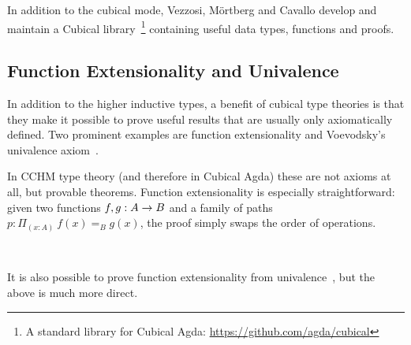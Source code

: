 In addition to the cubical mode, Vezzosi, M\"ortberg and Cavallo develop and
maintain a Cubical library~\footnote[1]{A standard library for Cubical
  Agda: \url{https://github.com/agda/cubical}} containing useful data types,
functions and proofs.

\subsection{Function Extensionality and Univalence}

In addition to the higher inductive types, a benefit of cubical type theories
is that they make it possible to prove
useful results that are usually only axiomatically defined. Two
prominent examples are function extensionality and Voevodsky's univalence
axiom~\cite{voevodsky2014}.

In CCHM type theory (and therefore in Cubical Agda) these are not axioms
at all, but provable theorems. Function extensionality is especially
straightforward: given two functions $f,g : A \rightarrow B$ and a
family of paths $p : \Pi_{(x:A)}~f(x) =_B g(x)$, the proof simply swaps the
order of operations.
\begin{code}%
\>[0]\AgdaSpace{}%
\AgdaSymbol{:}\AgdaSpace{}%
\AgdaSymbol{\{}\AgdaSpace{}%
\AgdaSpace{}%
\AgdaSymbol{:}\AgdaSpace{}%
\AgdaSymbol{\}}\AgdaSpace{}%
\AgdaSymbol{\{}\AgdaSpace{}%
\AgdaSpace{}%
\AgdaSymbol{:}\AgdaSpace{}%
\AgdaSpace{}%
\AgdaSpace{}%
\AgdaSymbol{\}}\AgdaSpace{}%
\AgdaSpace{}%
\AgdaSymbol{((}\AgdaSpace{}%
\AgdaSymbol{:}\AgdaSpace{}%
\AgdaSymbol{)}\AgdaSpace{}%
\AgdaSpace{}%
\AgdaSpace{}%
\AgdaSpace{}%
\AgdaSpace{}%
\AgdaSpace{}%
\AgdaSymbol{)}\AgdaSpace{}%
\AgdaSpace{}%
\AgdaSpace{}%
\AgdaSpace{}%
\<%
\\
\>[0]\AgdaSpace{}%
\AgdaSpace{}%
\AgdaSpace{}%
\AgdaSpace{}%
\AgdaSymbol{=}\AgdaSpace{}%
\AgdaSymbol{(}\AgdaSpace{}%
\AgdaSymbol{)}\AgdaSpace{}%
\<%
\end{code}
It is also possible to prove function extensionality from
univalence~\cite{gambino2016, bauer2011coq}, but the above is much
more direct.

